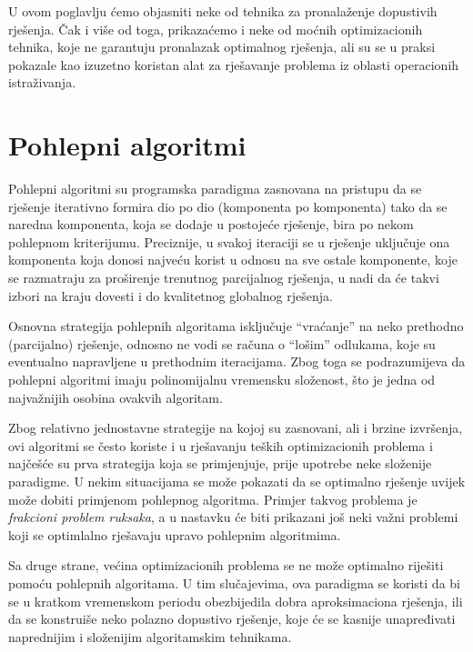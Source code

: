 \documentclass[a4paper, utf8, 11pt, colorlinks]{book}
\theoremstyle{definition}
\begin{document}
 U ovom poglavlju ćemo objasniti neke od tehnika za pronalaženje dopustivih rješenja. Čak i više od toga, prikazaćemo i neke od moćnih optimizacionih tehnika, koje ne garantuju  pronalazak optimalnog rješenja, ali su se u praksi pokazale kao izuzetno koristan alat za rješavanje problema iz oblasti operacionih istraživanja.
 

\section{Pohlepni algoritmi}
 
Pohlepni algoritmi su programska paradigma zasnovana na pristupu da se  rješenje iterativno formira dio po dio (komponenta po komponenta) tako da se naredna komponenta, koja se dodaje u postojeće rješenje, bira 
 po nekom pohlepnom kriterijumu. Preciznije, u svakoj iteraciji se u rješenje uključuje ona komponenta koja donosi najveću korist u odnosu na sve ostale komponente, koje se razmatraju za proširenje  trenutnog parcijalnog rješenja, u nadi da će takvi izbori na kraju dovesti i do kvalitetnog globalnog rješenja.
 
 
 Osnovna strategija pohlepnih algoritama isključuje ``vraćanje'' na neko prethodno (parcijalno) rješenje, odnosno ne vodi se računa o ``lošim'' odlukama, koje su eventualno napravljene u prethodnim iteracijama. Zbog toga se podrazumijeva da pohlepni algoritmi imaju polinomijalnu vremensku složenost, što je jedna od najvažnijih osobina ovakvih algoritam.
 
 Zbog relativno jednostavne strategije na kojoj su zasnovani, ali i brzine izvršenja, ovi algoritmi se često koriste i u rješavanju teških optimizacionih problema i najčešće su prva strategija koja se primjenjuje, prije 
upotrebe neke složenije paradigme. 
U nekim situacijama se može pokazati da se optimalno rješenje uvijek može dobiti primjenom pohlepnog algoritma. Primjer takvog problema je \emph{frakcioni problem ruksaka}, a u nastavku će biti prikazani još neki važni problemi koji se optimlalno rješavaju upravo pohlepnim algoritmima.
 
Sa druge strane, većina optimizacionih problema se ne može optimalno riješiti pomoću pohlepnih algoritama. U tim slučajevima, ova paradigma se koristi da bi se u kratkom vremenskom periodu obezbijedila dobra aproksimaciona rješenja, ili da se konstruiše neko polazno dopustivo rješenje, koje će se kasnije unapređivati naprednijim i složenijim algoritamskim tehnikama. 
\end{document}
